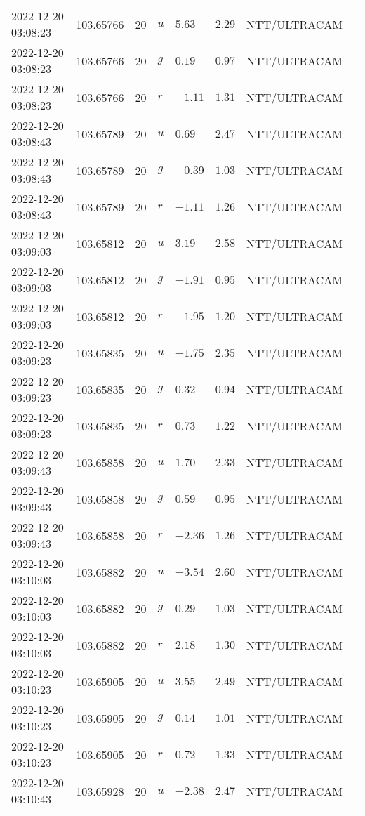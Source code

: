 \documentclass{nature_plusfigure}
\begin{document}
\begin{supplement}
\begin{center}
\begin{longtable}{llllllll}
2022-12-20 03:08:23 & 103.65766 & 20 & $u$ & $5.63$ & $2.29$ & NTT/ULTRACAM &  \\ 
2022-12-20 03:08:23 & 103.65766 & 20 & $g$ & $0.19$ & $0.97$ & NTT/ULTRACAM &  \\ 
2022-12-20 03:08:23 & 103.65766 & 20 & $r$ & $-1.11$ & $1.31$ & NTT/ULTRACAM &  \\ 
2022-12-20 03:08:43 & 103.65789 & 20 & $u$ & $0.69$ & $2.47$ & NTT/ULTRACAM &  \\ 
2022-12-20 03:08:43 & 103.65789 & 20 & $g$ & $-0.39$ & $1.03$ & NTT/ULTRACAM &  \\ 
2022-12-20 03:08:43 & 103.65789 & 20 & $r$ & $-1.11$ & $1.26$ & NTT/ULTRACAM &  \\ 
2022-12-20 03:09:03 & 103.65812 & 20 & $u$ & $3.19$ & $2.58$ & NTT/ULTRACAM &  \\ 
2022-12-20 03:09:03 & 103.65812 & 20 & $g$ & $-1.91$ & $0.95$ & NTT/ULTRACAM &  \\ 
2022-12-20 03:09:03 & 103.65812 & 20 & $r$ & $-1.95$ & $1.20$ & NTT/ULTRACAM &  \\ 
2022-12-20 03:09:23 & 103.65835 & 20 & $u$ & $-1.75$ & $2.35$ & NTT/ULTRACAM &  \\ 
2022-12-20 03:09:23 & 103.65835 & 20 & $g$ & $0.32$ & $0.94$ & NTT/ULTRACAM &  \\ 
2022-12-20 03:09:23 & 103.65835 & 20 & $r$ & $0.73$ & $1.22$ & NTT/ULTRACAM &  \\ 
2022-12-20 03:09:43 & 103.65858 & 20 & $u$ & $1.70$ & $2.33$ & NTT/ULTRACAM &  \\ 
2022-12-20 03:09:43 & 103.65858 & 20 & $g$ & $0.59$ & $0.95$ & NTT/ULTRACAM &  \\ 
2022-12-20 03:09:43 & 103.65858 & 20 & $r$ & $-2.36$ & $1.26$ & NTT/ULTRACAM &  \\ 
2022-12-20 03:10:03 & 103.65882 & 20 & $u$ & $-3.54$ & $2.60$ & NTT/ULTRACAM &  \\ 
2022-12-20 03:10:03 & 103.65882 & 20 & $g$ & $0.29$ & $1.03$ & NTT/ULTRACAM &  \\ 
2022-12-20 03:10:03 & 103.65882 & 20 & $r$ & $2.18$ & $1.30$ & NTT/ULTRACAM &  \\ 
2022-12-20 03:10:23 & 103.65905 & 20 & $u$ & $3.55$ & $2.49$ & NTT/ULTRACAM &  \\ 
2022-12-20 03:10:23 & 103.65905 & 20 & $g$ & $0.14$ & $1.01$ & NTT/ULTRACAM &  \\ 
2022-12-20 03:10:23 & 103.65905 & 20 & $r$ & $0.72$ & $1.33$ & NTT/ULTRACAM &  \\ 
2022-12-20 03:10:43 & 103.65928 & 20 & $u$ & $-2.38$ & $2.47$ & NTT/ULTRACAM &  \\ 

\end{longtable}
\end{center}
\end{supplement}
\end{document}
